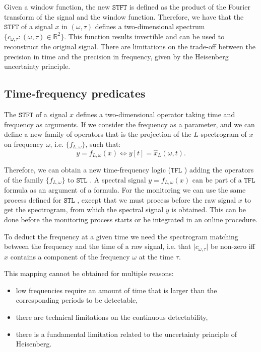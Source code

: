 \documentclass{suftesi}
\newcommand{\STL}{$\mathtt{STL}$ }
\newcommand{\TFL}{$\mathtt{TFL}$ }
\newcommand{\abs}[1]{\lvert #1 \rvert}
\begin{document}
Given a window function, the new $\mathtt{STFT}$ is defined as the product of the Fourier transform of the signal and the window function. Therefore, we have that the $\mathtt{STFT}$ of a signal $x$  in $(\omega,\tau)$ defines a two-dimensional spectrum $\{c_{\omega,\tau}:(\omega,\tau)\in\mathbb{R}^2\}$. This function results invertible and can be used to reconstruct the original signal. There are limitations on the trade-off between the precision in time and the precision in frequency, given by the Heisenberg uncertainty principle.

\subsection{Time-frequency predicates}

The $\mathtt{STFT}$ of a signal $x$ defines a two-dimensional operator taking time and frequency as arguments. If we consider the frequency as a parameter, and we can define a new family of operators that is the projection of the $L$-spectrogram of $x$ on frequency $\omega$, i.e.  $\{f_{L,\omega}\}$, such that: $$y=f_{L,\omega}(x) \Leftrightarrow y[t]=\hat{x}_L(\omega,t).$$

Therefore, we can obtain a new time-frequency logic (\TFL) adding the operators of the family $\{f_{L,\omega}\}$ to \STL. A spectral signal $y=f_{L,\omega}(x)$ can be part of a \TFL formula as an argument of a formula. For the monitoring we can use the same process defined for \STL, except that we must process before the raw signal $x$ to get the spectrogram, from which the spectral signal $y$ is obtained. This can be done before the monitoring process starts or be integrated in an online procedure.

To deduct the frequency at a given time we need the spectrogram matching between the frequency and the time of a raw signal, i.e. that $\abs{c_{\omega,\tau}}$ be non-zero iff $x$ contains a component of the frequency $\omega$ at the time $\tau$.

This mapping cannot be obtained for multiple reasons:
\begin{itemize} [leftmargin=0.5cm]
    \item low frequencies require an amount of time that is larger than the corresponding periods to be detectable,
    \item there are technical limitations on the continuous detectability,
    \item there is a fundamental limitation related to the uncertainty principle of Heisenberg.
\end{itemize}
\end{document}
